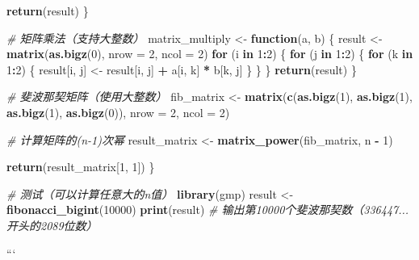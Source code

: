 \documentclass[
  twoside]{book}
\newenvironment{Shaded}{\begin{snugshade}}{\end{snugshade}}
\newcommand{\AttributeTok}[1]{\textcolor[rgb]{0.13,0.29,0.53}{#1}}
\newcommand{\CommentTok}[1]{\textcolor[rgb]{0.56,0.35,0.01}{\textit{#1}}}
\newcommand{\ControlFlowTok}[1]{\textcolor[rgb]{0.13,0.29,0.53}{\textbf{#1}}}
\newcommand{\DecValTok}[1]{\textcolor[rgb]{0.00,0.00,0.81}{#1}}
\newcommand{\FunctionTok}[1]{\textcolor[rgb]{0.13,0.29,0.53}{\textbf{#1}}}
\newcommand{\NormalTok}[1]{#1}
\newcommand{\OtherTok}[1]{\textcolor[rgb]{0.56,0.35,0.01}{#1}}
\newcommand{\SpecialCharTok}[1]{\textcolor[rgb]{0.81,0.36,0.00}{\textbf{#1}}}
\begin{document}
\begin{itemize}
\begin{Shaded}
\begin{Highlighting}[]
    \FunctionTok{return}\NormalTok{(result)}
\NormalTok{  \}}

  \CommentTok{\# 矩阵乘法（支持大整数）}
\NormalTok{  matrix\_multiply }\OtherTok{\textless{}{-}} \ControlFlowTok{function}\NormalTok{(a, b) \{}
\NormalTok{    result }\OtherTok{\textless{}{-}} \FunctionTok{matrix}\NormalTok{(}\FunctionTok{as.bigz}\NormalTok{(}\DecValTok{0}\NormalTok{), }\AttributeTok{nrow =} \DecValTok{2}\NormalTok{, }\AttributeTok{ncol =} \DecValTok{2}\NormalTok{)}
    \ControlFlowTok{for}\NormalTok{ (i }\ControlFlowTok{in} \DecValTok{1}\SpecialCharTok{:}\DecValTok{2}\NormalTok{) \{}
      \ControlFlowTok{for}\NormalTok{ (j }\ControlFlowTok{in} \DecValTok{1}\SpecialCharTok{:}\DecValTok{2}\NormalTok{) \{}
        \ControlFlowTok{for}\NormalTok{ (k }\ControlFlowTok{in} \DecValTok{1}\SpecialCharTok{:}\DecValTok{2}\NormalTok{) \{}
\NormalTok{          result[i, j] }\OtherTok{\textless{}{-}}\NormalTok{ result[i, j] }\SpecialCharTok{+}\NormalTok{ a[i, k] }\SpecialCharTok{*}\NormalTok{ b[k, j]}
\NormalTok{        \}}
\NormalTok{      \}}
\NormalTok{    \}}
    \FunctionTok{return}\NormalTok{(result)}
\NormalTok{  \}}

  \CommentTok{\# 斐波那契矩阵（使用大整数）}
\NormalTok{  fib\_matrix }\OtherTok{\textless{}{-}} \FunctionTok{matrix}\NormalTok{(}\FunctionTok{c}\NormalTok{(}\FunctionTok{as.bigz}\NormalTok{(}\DecValTok{1}\NormalTok{), }\FunctionTok{as.bigz}\NormalTok{(}\DecValTok{1}\NormalTok{), }\FunctionTok{as.bigz}\NormalTok{(}\DecValTok{1}\NormalTok{), }\FunctionTok{as.bigz}\NormalTok{(}\DecValTok{0}\NormalTok{)),}
                      \AttributeTok{nrow =} \DecValTok{2}\NormalTok{, }\AttributeTok{ncol =} \DecValTok{2}\NormalTok{)}

  \CommentTok{\# 计算矩阵的(n{-}1)次幂}
\NormalTok{  result\_matrix }\OtherTok{\textless{}{-}} \FunctionTok{matrix\_power}\NormalTok{(fib\_matrix, n }\SpecialCharTok{{-}} \DecValTok{1}\NormalTok{)}

  \FunctionTok{return}\NormalTok{(result\_matrix[}\DecValTok{1}\NormalTok{, }\DecValTok{1}\NormalTok{])}
\NormalTok{\}}

\CommentTok{\# 测试（可以计算任意大的n值）}
\FunctionTok{library}\NormalTok{(gmp)}
\NormalTok{result }\OtherTok{\textless{}{-}} \FunctionTok{fibonacci\_bigint}\NormalTok{(}\DecValTok{10000}\NormalTok{)}
\FunctionTok{print}\NormalTok{(result)  }\CommentTok{\# 输出第10000个斐波那契数（336447...开头的2089位数）}
\end{Highlighting}
\end{Shaded}

  ```
\end{itemize}
\end{document}

